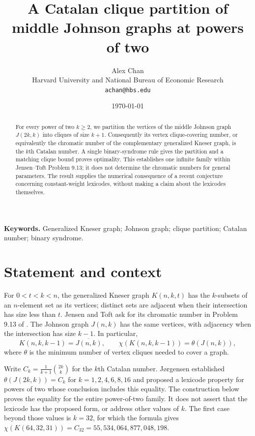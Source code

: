 \documentclass[11pt]{article}
\title{A Catalan clique partition of middle Johnson graphs at powers of two}
\author{Alex Chan\\[2pt]
  \small Harvard University and National Bureau of Economic Research\\[-1pt]
  \small \texttt{achan@hbs.edu}}
\date{\today}
\begin{document}
\maketitle

\begin{abstract}
For every power of two $k\geq2$, we partition the vertices of the middle Johnson graph $J(2k,k)$ into cliques of size $k+1$.  Consequently its vertex clique-covering number, or equivalently the chromatic number of the complementary generalized Kneser graph, is the $k$th Catalan number.  A single binary-syndrome rule gives the partition and a matching clique bound proves optimality.  This establishes one infinite family within Jensen--Toft Problem 9.13; it does not determine the chromatic numbers for general parameters.  The result supplies the numerical consequence of a recent conjecture concerning constant-weight lexicodes, without making a claim about the lexicodes themselves.
\end{abstract}

\noindent\textbf{Keywords.} Generalized Kneser graph; Johnson graph; clique partition; Catalan number; binary syndrome.

\section{Statement and context}
For $0<t<k<n$, the generalized Kneser graph $K(n,k,t)$ has the $k$-subsets of an $n$-element set as its vertices; distinct sets are adjacent when their intersection has size less than $t$.  Jensen and Toft ask for its chromatic number in Problem 9.13 of \cite{JT}.  The Johnson graph $J(n,k)$ has the same vertices, with adjacency when the intersection has size $k-1$.  In particular,
\begin{equation}\label{eq:complement}
 K(n,k,k-1)=\overline{J(n,k)},
 \qquad \chi(K(n,k,k-1))=\theta(J(n,k)),
\end{equation}
where $\theta$ is the minimum number of vertex cliques needed to cover a graph.

Write $C_k=\frac{1}{k+1}\binom{2k}{k}$ for the $k$th Catalan number.  J\o rgensen \cite{Jorgensen} established $\theta(J(2k,k))=C_k$ for $k=1,2,4,6,8,16$ and proposed a lexicode property for powers of two whose conclusion includes this equality.  The construction below proves the equality for the entire power-of-two family.  It does not assert that the lexicode has the proposed form, or address other values of $k$.  The first case beyond those values is $k=32$, for which the formula gives $\chi(K(64,32,31))=C_{32}=55{,}534{,}064{,}877{,}048{,}198$.
\end{document}
